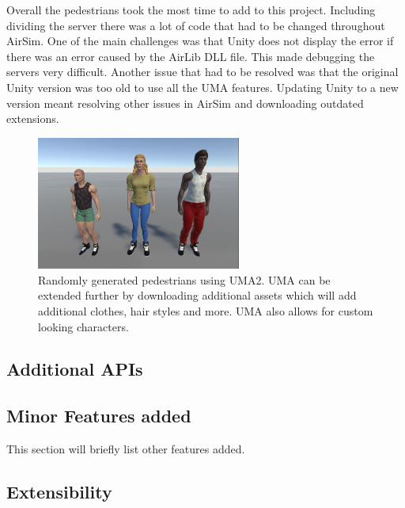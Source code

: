 Overall the pedestrians took the most time to add to this project. Including dividing the server there was a lot of code that had to be changed throughout AirSim. One of the main challenges was that Unity does not display the error if there was an error caused by the AirLib DLL file. This made debugging the servers very difficult. Another issue that had to be resolved was that the original Unity version was too old to use all the UMA features. Updating Unity to a new version meant resolving other issues in AirSim and downloading outdated extensions. 
\begin{figure}[H]
    \centering
    \includegraphics[width=0.6\textwidth]{06_Implementation/00_AirSim/Diagrams/RandomPedestrians.JPG}
    \caption{Randomly generated pedestrians using UMA2. UMA can be extended further by downloading additional assets which will add additional clothes, hair styles and more. UMA also allows for custom looking characters.} \label{06:umaCharacters}
\end{figure}

\subsection{Additional APIs}


\subsection{Minor Features added}
This section will briefly list other features added. 

\subsection{Extensibility}






